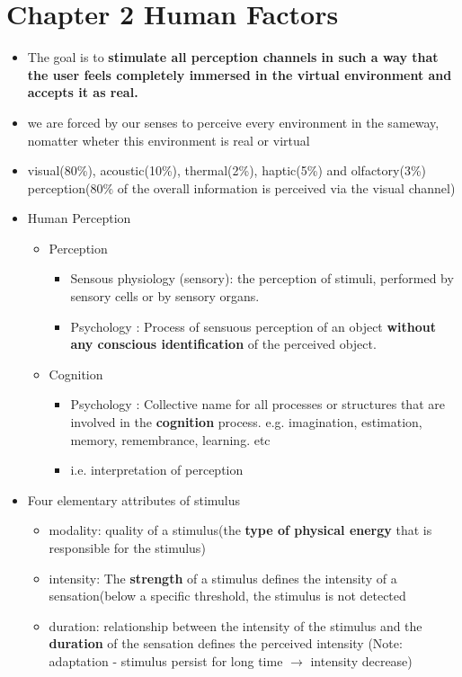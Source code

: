 \documentclass{standalone}
\begin{document}
\section{Chapter 2 Human Factors}
\begin{itemize}
	\item The goal is to \textbf{stimulate all perception channels in such a way that the user feels completely immersed in the virtual environment and accepts it as real.}
	\item we are forced by our senses to perceive every environment in the sameway, nomatter wheter this environment is real or virtual
	\item visual(80\%), acoustic(10\%), thermal(2\%), haptic(5\%) and olfactory(3\%) perception($80\%$ of the overall information is perceived via the visual channel)
	\item Human Perception
	\begin{itemize}
		\item Perception
		\begin{itemize}
			\item Sensous physiology (sensory): the perception of stimuli, performed by sensory cells or by sensory organs.
			\item Psychology : Process of sensuous perception of an object \textbf{without any conscious identification} of the perceived object.
		\end{itemize}
		\item Cognition
		\begin{itemize}
			\item Psychology : Collective name for all processes or structures that are involved in the \textbf{cognition} process. e.g. imagination, estimation, memory, remembrance, learning. etc 
			\item i.e. interpretation of perception
		\end{itemize}
	\end{itemize}
	\item Four elementary attributes of stimulus
	\begin{itemize}
		\item modality: quality of a stimulus(the \textbf{type of physical energy} that is responsible for the stimulus)
		\item intensity: The \textbf{strength} of a stimulus defines the intensity of a sensation(below a specific threshold, the stimulus is not detected
		\item duration: relationship between the intensity of the stimulus and the \textbf{duration} of the sensation defines the perceived intensity (Note: adaptation - stimulus persist for long time $\rightarrow$ intensity decrease)

\end{itemize}
\end{itemize}
\end{document}
